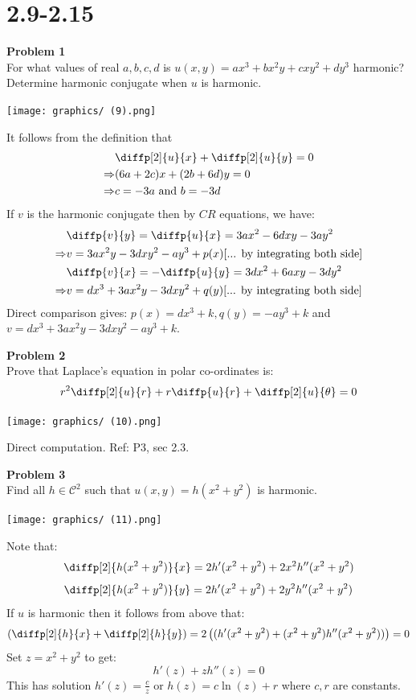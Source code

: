 \documentclass[12pt,oneside]{book}
\begin{document}
\section{2.9-2.15}
\begin{tcolorbox}[colback=blue!15]
    \textbf{Problem 1}\\
    For what values of real $a,b,c,d$ is $u(x,y)=ax^3+bx^2y+cxy^2+dy^3$ harmonic? Determine harmonic conjugate when $u$ is harmonic.
\end{tcolorbox}
\begin{marginfigure}%
    \texttt{[image: graphics/ (9).png]}
\end{marginfigure}%
It follows from the definition that
\begin{align*}
    &\diffp[2]{u}{x}+\diffp[2]{u}{y}=0\\
    \Rightarrow&(6a+2c)x+(2b+6d)y=0\\
    \Rightarrow&c=-3a\text{ and }b=-3d
\end{align*}
If $v$ is the harmonic conjugate then by $CR$ equations, we have:
\begin{align*}
    &\diffp{v}{y}=\diffp{u}{x}=3ax^2-6dxy-3ay^2\\
    \Rightarrow&v=3ax^2y-3dxy^2-ay^3+p(x)[\text{... by integrating both side}]\\
    &\diffp{v}{x}=-\diffp{u}{y}=3dx^2+6axy-3dy^2\\
    \Rightarrow&v=dx^3+3ax^2y-3dxy^2+q(y)[\text{... by integrating both side}]
\end{align*}
Direct comparison gives: $p(x)=dx^3+k,q(y)=-ay^3+k$ and $v=dx^3+3ax^2y-3dxy^2-ay^3+k$. 

\begin{tcolorbox}[colback=blue!15]
    \textbf{Problem 2}\\
    Prove that Laplace's equation in polar co-ordinates is:
    $$r^2\diffp[2]{u}{r}+r\diffp{u}{r}+\diffp[2]{u}{\theta}=0$$
\end{tcolorbox}
\begin{marginfigure}%
    \texttt{[image: graphics/ (10).png]}
\end{marginfigure}%
Direct computation. Ref: P3, sec 2.3. 

\begin{tcolorbox}[colback=blue!15]
    \textbf{Problem 3}\\
    Find all $h\in \mathcal C^2$ such that $u(x,y)=h(x^2+y^2)$ is harmonic. 
\end{tcolorbox}
\begin{marginfigure}%
    \texttt{[image: graphics/ (11).png]}
\end{marginfigure}%
Note that:
$$\diffp[2]{h(x^2+y^2)}{x}=2h'(x^2+y^2)+2x^2h''(x^2+y^2)$$
$$\diffp[2]{h(x^2+y^2)}{y}=2h'(x^2+y^2)+2y^2h''(x^2+y^2)$$
If $u$ is harmonic then it follows from above that:
$$\left(\diffp[2]{h}{x}+\diffp[2]{h}{y}\right)=2\left((h'(x^2+y^2)+(x^2+y^2)h''(x^2+y^2))\right)=0$$
Set $z=x^2+y^2$ to get:
$$h'(z)+zh''(z)=0$$
This has solution $h'(z)=\frac{c}{z}$ or $h(z)=c\ln(z)+r$ where $c,r$ are constants.
\end{document}
